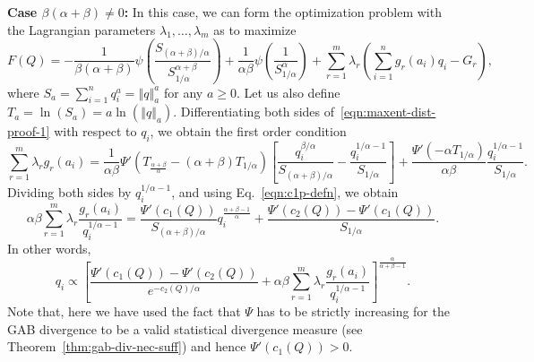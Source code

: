 \documentclass[11pt]{article}
\theoremstyle{plain}
\theoremstyle{remark}
\newcommand{\norm}[1]{\left\Vert #1 \right\Vert}
\begin{document}
\noindent\textbf{Case $\beta(\alpha+\beta) \neq 0$:} In this case, we can form the optimization problem with the Lagrangian parameters $\lambda_1, \dots, \lambda_m$ as to maximize
\begin{equation}
    F(Q) = -\dfrac{1}{\beta(\alpha+\beta)}\psi\left( \frac{S_{(\alpha+\beta)/\alpha}}{S_{1/\alpha}^{\alpha+\beta}} \right) + \dfrac{1}{\alpha\beta}\psi\left(\frac{1}{S_{1/\alpha}^\alpha} \right) + \sum_{r=1}^m \lambda_r \left( \sum_{i=1}^n g_r(a_i)q_i - G_r \right),
    \label{eqn:maxent-dist-proof-1}
\end{equation}
\noindent where $S_a = \sum_{i=1}^n q_i^a = \norm{q}_a^a$ for any $a \geq 0$. Let us also define $T_a = \ln(S_a) = a\ln(\norm{q}_a)$. Differentiating both sides of~\eqref{eqn:maxent-dist-proof-1} with respect to $q_i$, we obtain the first order condition
\begin{equation*}
    \sum_{r=1}^m \lambda_r g_r(a_i)
    = \frac{1}{\alpha\beta}\Psi'\left( T_{\frac{\alpha+\beta}{\alpha}} - (\alpha+\beta)T_{1/\alpha} \right)\left[ \dfrac{q_i^{\beta/\alpha}}{S_{(\alpha+\beta)/\alpha}} - \dfrac{q_i^{1/\alpha-1}}{S_{1/\alpha}} \right]
    + \frac{\Psi'\left( -\alpha T_{1/\alpha} \right)}{\alpha\beta} \dfrac{q_i^{1/\alpha-1}}{S_{1/\alpha}}.
\end{equation*}
\noindent Dividing both sides by $q_i^{1/\alpha-1}$, and using Eq.~\eqref{eqn:c1p-defn}, we obtain
\begin{equation*}
    \alpha\beta\sum_{r=1}^m \lambda_r \frac{g_r(a_i)}{q_i^{1/\alpha-1}}
    = \dfrac{\Psi'(c_1(Q))}{S_{(\alpha+\beta)/\alpha}} q_i^{\frac{\alpha+\beta-1}{\alpha}} + \frac{\Psi'(c_2(Q)) - \Psi'(c_1(Q))}{S_{1/\alpha}}.
\end{equation*}
\noindent In other words,
\begin{equation*}
    q_i \propto \left[ \frac{\Psi'(c_1(Q)) - \Psi'(c_2(Q))}{e^{-c_2(Q)/\alpha}} + \alpha\beta \sum_{r=1}^m \lambda_r \frac{g_r(a_i)}{q_i^{1/\alpha-1}} \right]^{\frac{\alpha}{\alpha+\beta-1}}.
\end{equation*}
\noindent Note that, here we have used the fact that $\Psi$ has to be strictly increasing for the GAB divergence to be a valid statistical divergence measure (see Theorem~\ref{thm:gab-div-nec-suff}) and hence $\Psi'(c_1(Q)) > 0$.
\end{document}
